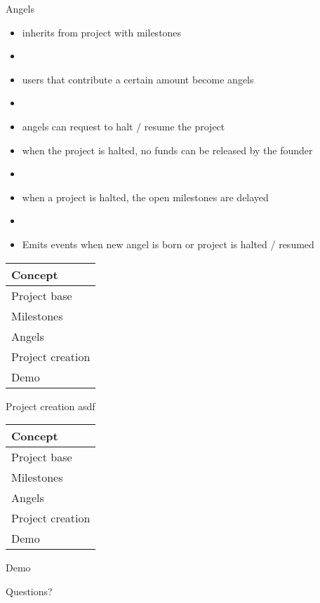 \documentclass{beamer}
\begin{document}
\begin{frame}{Angels}
\begin{itemize}
    \item inherits from project with milestones
	\item[]
	\item users that contribute a certain amount become angels
	\item[]
	\item angels can request to halt / resume the project
	\item when the project is halted, no funds can be released by the founder
	\item[]
	\item when a project is halted, the open milestones are delayed
	\item[]
	\item Emits events when new angel is born or project is halted / resumed
\end{itemize}
\end{frame}




\begin{frame}
	\begin{tabularx}{\textwidth}{X}
		\hline
		Concept\\
		\hline
		Project base\\
		\hline
		Milestones\\
		\hline
		Angels\\
		\hline
		\rowcolor{hcolor}
		Project creation\\
		\hline
		Demo\\
		\hline
	\end{tabularx}
\end{frame}


\begin{frame}{Project creation}
asdf
\end{frame}


\begin{frame}
	\begin{tabularx}{\textwidth}{X}
		\hline
		Concept\\
		\hline
		Project base\\
		\hline
		Milestones\\
		\hline
		Angels\\
		\hline
		Project creation\\
		\hline
		\rowcolor{hcolor}
		Demo\\
		\hline
	\end{tabularx}
\end{frame}



\begin{frame}
	\begin{center}
		\huge{Demo}
	\end{center}
\end{frame}



\begin{frame}
	\begin{center}
		\huge{Questions?}
	\end{center}
\end{frame}
\end{document}
